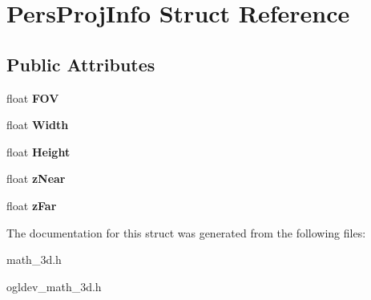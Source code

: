\hypertarget{structPersProjInfo}{\section{Pers\-Proj\-Info Struct Reference}
\label{structPersProjInfo}
}
\subsection*{Public Attributes}
\begin{DoxyCompactItemize}
\item 
\hypertarget{structPersProjInfo_ad730c82443fa16104cda3b9d3fa50710}{float {\bfseries F\-O\-V}}\label{structPersProjInfo_ad730c82443fa16104cda3b9d3fa50710}

\item 
\hypertarget{structPersProjInfo_aa9513ab993e3ecbce36954e487995150}{float {\bfseries Width}}\label{structPersProjInfo_aa9513ab993e3ecbce36954e487995150}

\item 
\hypertarget{structPersProjInfo_aef78e4b62ec21fda782cd0d88cdbbdb7}{float {\bfseries Height}}\label{structPersProjInfo_aef78e4b62ec21fda782cd0d88cdbbdb7}

\item 
\hypertarget{structPersProjInfo_a3af7af16a3f33e3de6fe4db6d5413094}{float {\bfseries z\-Near}}\label{structPersProjInfo_a3af7af16a3f33e3de6fe4db6d5413094}

\item 
\hypertarget{structPersProjInfo_abfcb3315b5516ec433acf16ac7e28998}{float {\bfseries z\-Far}}\label{structPersProjInfo_abfcb3315b5516ec433acf16ac7e28998}

\end{DoxyCompactItemize}


The documentation for this struct was generated from the following files\-:\begin{DoxyCompactItemize}
\item 
math\-\_\-3d.\-h\item 
ogldev\-\_\-math\-\_\-3d.\-h\end{DoxyCompactItemize}
